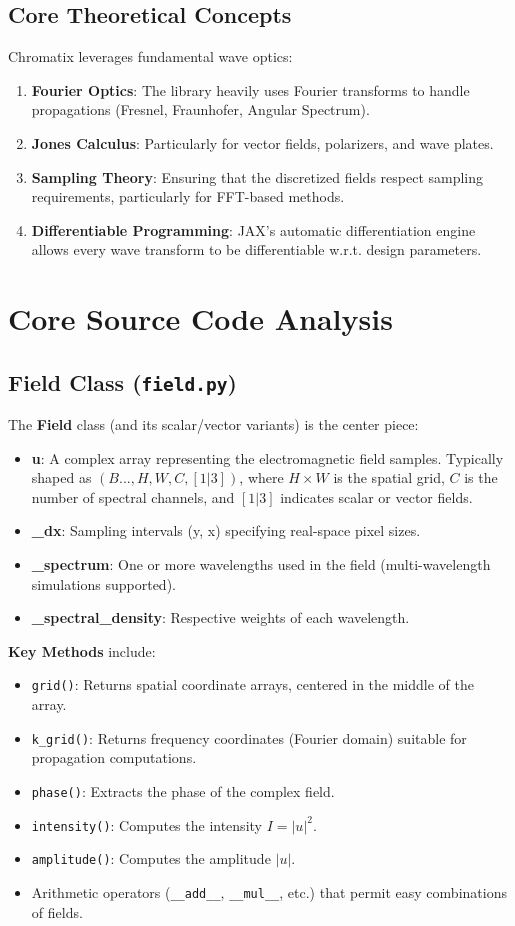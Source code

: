 \documentclass[a4paper,12pt]{report}
\begin{document}
\section{Core Theoretical Concepts}
Chromatix leverages fundamental wave optics:
\begin{enumerate}
    \item \textbf{Fourier Optics}: The library heavily uses Fourier transforms to handle propagations (Fresnel, Fraunhofer, Angular Spectrum).
    \item \textbf{Jones Calculus}: Particularly for vector fields, polarizers, and wave plates.
    \item \textbf{Sampling Theory}: Ensuring that the discretized fields respect sampling requirements, particularly for FFT-based methods.
    \item \textbf{Differentiable Programming}: JAX's automatic differentiation engine allows every wave transform to be differentiable w.r.t. design parameters.
\end{enumerate}

\chapter{Core Source Code Analysis}
\section{Field Class (\texttt{field.py})}
The \textbf{Field} class (and its scalar/vector variants) is the center piece:
\begin{itemize}
    \item \textbf{u}: A complex array representing the electromagnetic field samples. Typically shaped as $(B..., H, W, C, [1|3])$, where $H\times W$ is the spatial grid, $C$ is the number of spectral channels, and $[1|3]$ indicates scalar or vector fields.
    \item \textbf{\_dx}: Sampling intervals (y, x) specifying real-space pixel sizes.
    \item \textbf{\_spectrum}: One or more wavelengths used in the field (multi-wavelength simulations supported).
    \item \textbf{\_spectral\_density}: Respective weights of each wavelength.
\end{itemize}
\noindent \textbf{Key Methods} include:
\begin{itemize}
    \item \texttt{grid()}: Returns spatial coordinate arrays, centered in the middle of the array.
    \item \texttt{k\_grid()}: Returns frequency coordinates (Fourier domain) suitable for propagation computations.
    \item \texttt{phase()}: Extracts the phase of the complex field.
    \item \texttt{intensity()}: Computes the intensity $I=|u|^2$.
    \item \texttt{amplitude()}: Computes the amplitude $|u|$.
    \item Arithmetic operators (\texttt{\_\_add\_\_}, \texttt{\_\_mul\_\_}, etc.) that permit easy combinations of fields.
\end{itemize}
\end{document}
